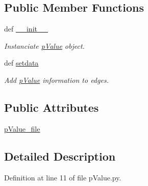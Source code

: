 \subsection*{\-Public \-Member \-Functions}
\begin{DoxyCompactItemize}
\item 
def \hyperlink{classirna_1_1David2tulip_1_1pValue_1_1pValue_a945f595d1168ff1d784158e288eca6c5}{\-\_\-\-\_\-init\-\_\-\-\_\-}
\begin{DoxyCompactList}\small\item\em \-Instanciate \hyperlink{classirna_1_1David2tulip_1_1pValue_1_1pValue}{p\-Value} object. \end{DoxyCompactList}\item 
def \hyperlink{classirna_1_1David2tulip_1_1pValue_1_1pValue_aee01c864a0b115b77db329a63b5026a0}{setdata}
\begin{DoxyCompactList}\small\item\em \-Add \hyperlink{classirna_1_1David2tulip_1_1pValue_1_1pValue}{p\-Value} information to edges. \end{DoxyCompactList}\end{DoxyCompactItemize}
\subsection*{\-Public \-Attributes}
\begin{DoxyCompactItemize}
\item 
\hyperlink{classirna_1_1David2tulip_1_1pValue_1_1pValue_a3becbaf9339896fcb5a0b9caeaa6d06e}{p\-Value\-\_\-file}
\end{DoxyCompactItemize}


\subsection{\-Detailed \-Description}


\-Definition at line 11 of file p\-Value.\-py.



